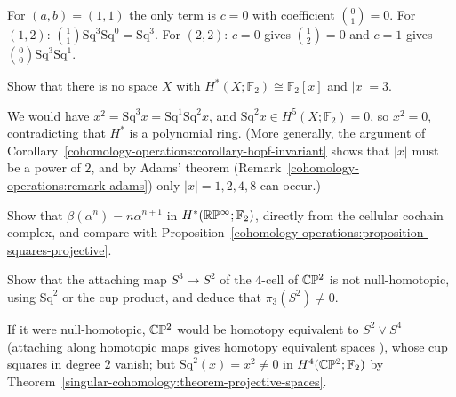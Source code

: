 \begin{solution}
For $(a, b) = (1, 1)$ the only term is $c = 0$ with coefficient $\binom{0}{1} = 0$. For $(1, 2)$: $\binom{1}{1}\mathrm{Sq}^3\mathrm{Sq}^0 = \mathrm{Sq}^3$. For $(2, 2)$: $c = 0$ gives $\binom{1}{2} = 0$ and
$c = 1$ gives $\binom{0}{0}\mathrm{Sq}^3\mathrm{Sq}^1$.
\end{solution}

\begin{exercise}\label{cohomology-operations:exercise-polynomial-degree-three}
Show that there is no space $X$ with $H^*(X; \mathbb{F}_2) \cong \mathbb{F}_2[x]$ and $|x| = 3$.
\end{exercise}

\begin{solution}
We would have $x^2 = \mathrm{Sq}^3x = \mathrm{Sq}^1\mathrm{Sq}^2x$, and $\mathrm{Sq}^2x \in H^5(X; \mathbb{F}_2) = 0$, so $x^2 = 0$, contradicting that $H^*$ is a polynomial ring. (More generally, the argument of Corollary~\ref{cohomology-operations:corollary-hopf-invariant} shows that
$|x|$ must be a power of $2$, and by Adams' theorem (Remark~\ref{cohomology-operations:remark-adams}) only $|x| = 1, 2, 4, 8$ can occur.)
\end{solution}

\begin{exercise}\label{cohomology-operations:exercise-bockstein-rp}
Show that $\beta(\alpha^n) = n\alpha^{n+1}$ in $H^*(\mathbb{R}\mathbb{P}^\infty; \mathbb{F}_2)$, directly from the cellular cochain complex, and compare with
Proposition~\ref{cohomology-operations:proposition-squares-projective}.
\end{exercise}

\begin{exercise}\label{cohomology-operations:exercise-cp2-attaching}
Show that the attaching map $S^3 \to S^2$ of the $4$-cell of $\mathbb{C}\mathbb{P}^2$ is not null-homotopic, using $\mathrm{Sq}^2$ or the cup product, and deduce that $\pi_3(S^2) \neq 0$.
\end{exercise}

\begin{solution}
If it were null-homotopic, $\mathbb{C}\mathbb{P}^2$ would be homotopy equivalent to $S^2 \vee S^4$ (attaching along homotopic maps gives homotopy equivalent spaces \cite[Proposition 0.18]{hatcher-at}),
whose cup squares in degree $2$ vanish; but $\mathrm{Sq}^2(x) = x^2 \neq 0$ in $H^4(\mathbb{C}\mathbb{P}^2; \mathbb{F}_2)$ by Theorem~\ref{singular-cohomology:theorem-projective-spaces}.
\end{solution}
